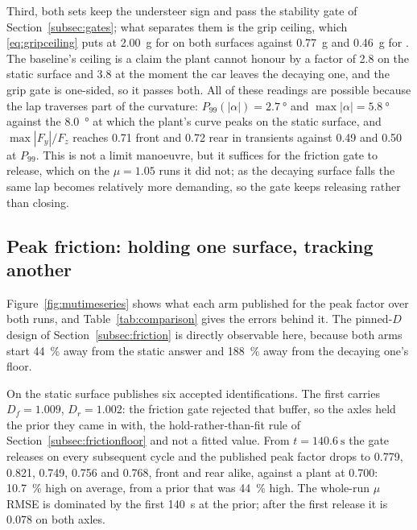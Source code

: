 Third, both sets keep the understeer sign and pass the stability gate of
Section~\ref{subsec:gates}; what separates them is the grip ceiling, which
\eqref{eq:gripceiling} puts at \SI{2.00}{\g} for \basearm{} on both surfaces
against \SI{0.77}{\g} and \SI{0.46}{\g} for \oursarm{}. The baseline's ceiling
is a claim the plant cannot honour by a factor of \num{2.8} on the static
surface and \num{3.8} at the moment the car leaves the decaying one, and the
grip gate is one-sided, so it passes both. All of these readings are possible
because the lap traverses part of the curvature:
$P_{99}(|\alpha|)=\SI{2.7}{\degree}$ and $\max|\alpha|=\SI{5.8}{\degree}$
against the \SI{8.0}{\degree} at which the plant's curve peaks on the static
surface, and $\max|F_{y}|/F_{z}$ reaches \num{0.71} front and \num{0.72} rear
in transients against \num{0.49} and \num{0.50} at $P_{99}$. This is not a
limit manoeuvre, but it suffices for the friction gate to release, which on the
$\mu=\num{1.05}$ runs it did not; as the decaying surface falls the same lap
becomes relatively more demanding, so the gate keeps releasing rather than
closing.

\subsection{Peak friction: holding one surface, tracking another}
\label{subsec:resultsmu}

Figure~\ref{fig:mutimeseries} shows what each arm published for the peak factor
over both runs, and Table~\ref{tab:comparison} gives the errors behind it. The
pinned-$D$ design of Section~\ref{subsec:friction} is directly observable here,
because both arms start \SI{44}{\percent} away from the static answer and
\SI{188}{\percent} away from the decaying one's floor.

On the static surface \oursarm{} publishes six accepted identifications. The
first carries $D_{f}=\num{1.009}$, $D_{r}=\num{1.002}$: the friction gate
rejected that buffer, so the axles held the prior they came in with, the
hold-rather-than-fit rule of Section~\ref{subsec:frictionfloor} and not a fitted
value. From $t=\SI{140.6}{\second}$ the gate releases on every subsequent cycle
and the published peak factor drops to \num{0.779}, \num{0.821}, \num{0.749},
\num{0.756} and \num{0.768}, front and rear alike, against a plant at
\num{0.700}: \SI{10.7}{\percent} high on average, from a prior that was
\SI{44}{\percent} high. The whole-run $\mu$ RMSE is dominated by the first
\SI{140}{\second} at the prior; after the first release it is \num{0.078} on
both axles.

